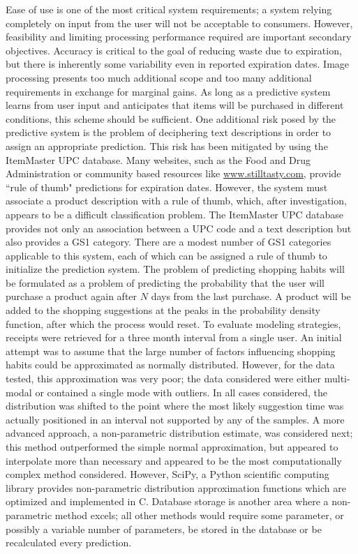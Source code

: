 \documentclass[11pt]{article} %
\begin{document}
\newline \quad \newline
Ease of use is one of the most critical system requirements; a system relying completely on input from the user will not be acceptable to consumers. However, feasibility and limiting processing performance required are important secondary objectives. Accuracy is critical to the goal of reducing waste due to expiration, but there is inherently some variability even in reported expiration dates. Image processing presents too much additional scope and too many additional requirements in exchange for marginal gains. As long as a predictive system learns from user input and anticipates that items will be purchased in different conditions, this scheme should be sufficient. One additional risk posed by the predictive system is the problem of deciphering text descriptions in order to assign an appropriate prediction. This risk has been mitigated by using the ItemMaster UPC database. Many websites, such as the Food and Drug Administration or community based resources like \url{www.stilltasty.com}, provide ``rule of thumb"  predictions for expiration dates. However, the system must associate a product description with a rule of thumb, which, after investigation, appears to be a difficult classification problem. The ItemMaster UPC database provides not only an association between a UPC code and a text description but also provides a GS1 category. There are a modest number of GS1 categories applicable to this system, each of which can be assigned a rule of thumb to initialize the prediction system.
\newline \quad \newline
The problem of predicting shopping habits will be formulated as a problem of predicting the probability that the user will purchase a product again after $N$ days from the last purchase. A product will be added to the shopping suggestions at the peaks in the probability density function, after which the process would reset. To evaluate modeling strategies, receipts were retrieved for a three month interval from a single user. An initial attempt was to assume that the large number of factors influencing shopping habits could be approximated as normally distributed. However, for the data tested, this approximation was very poor; the data considered were either multi-modal or contained a single mode with outliers. In all cases considered, the distribution was shifted to the point where the most likely suggestion time was actually positioned in an interval not supported by any of the samples. A more advanced approach, a non-parametric distribution estimate, was considered next; this method outperformed the simple normal approximation, but appeared to interpolate more than necessary and appeared to be the most computationally complex method considered. However, SciPy, a Python scientific computing library provides non-parametric distribution approximation functions which are optimized and implemented in C. Database storage is another area where a non-parametric method excels; all other methods would require some parameter, or possibly a variable number of parameters, be stored in the database or be recalculated every prediction. 
\end{document}
